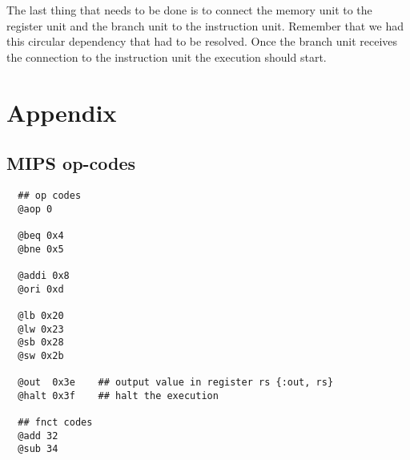 \documentclass[a4paper,11pt]{article}
\begin{document}
The last thing that needs to be done is to connect the memory unit to
the register unit and the branch unit to the instruction unit.
Remember that we had this circular dependency that had to be
resolved. Once the branch unit receives the connection to the
instruction unit the execution should start. 



\pagebreak
\section*{Appendix}


\subsection*{MIPS op-codes}

\begin{verbatim}
  ## op codes
  @aop 0

  @beq 0x4
  @bne 0x5

  @addi 0x8
  @ori 0xd

  @lb 0x20
  @lw 0x23
  @sb 0x28
  @sw 0x2b

  @out  0x3e    ## output value in register rs {:out, rs}
  @halt 0x3f    ## halt the execution
  
  ## fnct codes 
  @add 32
  @sub 34
\end{verbatim}
\end{document}
